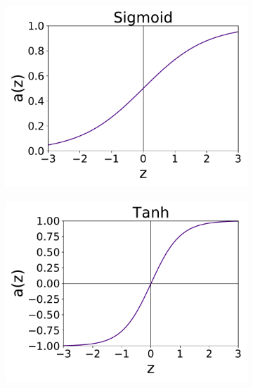 
\begin{figure}[H]
    \centering
    \begin{subfigure}[t!]{0.3\textwidth}
    \includegraphics[width=\textwidth]{Figures/sigmoid.pdf}
    \caption{}
    \label{fig:sigmoid}
    \end{subfigure}
    \begin{subfigure}[t!]{0.3\textwidth}
    \includegraphics[width=\textwidth]{Figures/tanh.pdf}
    \caption{}
    \label{fig:tanh}
    \end{subfigure}

\end{figure}
